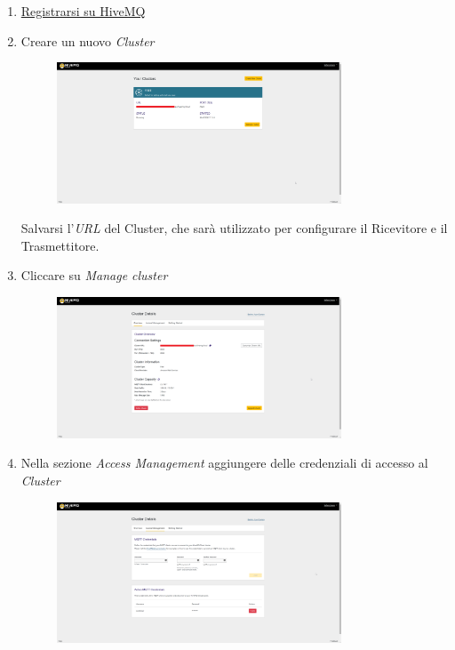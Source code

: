 \documentclass[a4paper,11pt]{article}
\begin{document}
    \begin{enumerate}
      \item \href{https://console.hivemq.cloud/}{Registrarsi su HiveMQ}
      \item Creare un nuovo \emph{Cluster}
        \begin{figure}[H]
          \centering
          \includegraphics[width=0.8\textwidth,height=\textheight,keepaspectratio]{assets/hivemq_clusters}
        \end{figure}

        Salvarsi l'\emph{URL} del Cluster, che sarà utilizzato per configurare il Ricevitore e il Trasmettitore.

      \item Cliccare su \emph{Manage cluster}
        \begin{figure}[H]
          \centering
          \includegraphics[width=0.8\textwidth,height=\textheight,keepaspectratio]{assets/hivemq_clusterdetails}
        \end{figure}

      \item Nella sezione \emph{Access Management} aggiungere delle credenziali di accesso al \emph{Cluster}
        \begin{figure}[H]
          \centering
          \includegraphics[width=0.8\textwidth,height=\textheight,keepaspectratio]{assets/hivemq_access_management}
        \end{figure}

    \end{enumerate}
\end{document}
